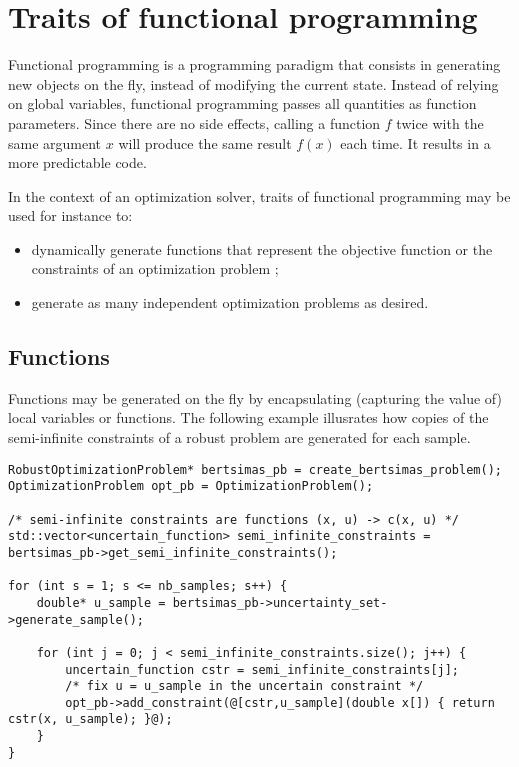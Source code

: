 \documentclass[11pt,twoside]{book}
\begin{document}
\chapter{Traits of functional programming}

Functional programming is a programming paradigm that consists in
generating new objects on the fly, instead of modifying the current
state.
Instead of relying on global variables, functional programming passes
all quantities as function parameters. Since there are no side effects,
calling a function $f$ twice with the same argument $x$ will produce the
same result $f(x)$ each time. It results in a more predictable code.

In the context of an optimization solver, traits of functional
programming may be used for instance to:

\begin{itemize}
\item dynamically generate functions that represent the objective
function or the constraints of an optimization problem ;
\item generate as many independent optimization problems as desired.
\end{itemize}

\section{Functions}

Functions may be generated on the fly by encapsulating (capturing the
value of) local variables or functions. The following example illusrates
how copies of the semi-infinite constraints of a robust problem are
generated for each sample.

\begin{lstlisting}[style=base]
RobustOptimizationProblem* bertsimas_pb = create_bertsimas_problem();
OptimizationProblem opt_pb = OptimizationProblem();

/* semi-infinite constraints are functions (x, u) -> c(x, u) */
std::vector<uncertain_function> semi_infinite_constraints = bertsimas_pb->get_semi_infinite_constraints();

for (int s = 1; s <= nb_samples; s++) {
	double* u_sample = bertsimas_pb->uncertainty_set->generate_sample();

	for (int j = 0; j < semi_infinite_constraints.size(); j++) {
		uncertain_function cstr = semi_infinite_constraints[j];
		/* fix u = u_sample in the uncertain constraint */
		opt_pb->add_constraint(@[cstr,u_sample](double x[]) { return cstr(x, u_sample); }@);
	}
}
\end{lstlisting}
\end{document}
